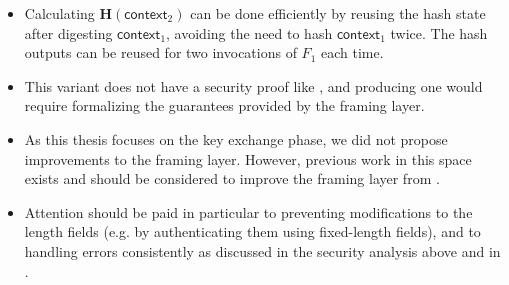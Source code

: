 \begin{itemize}
    \item Calculating $\mathbf{H}(\mathsf{context}_2)$ can be done efficiently by reusing the hash state after digesting $\mathsf{context}_1$, avoiding the need to hash $\mathsf{context}_1$ twice. The hash outputs can be reused for two invocations of $F_1$ each time.
    
    \item This variant does not have a security proof like \drivel{}, and producing one would require formalizing the guarantees provided by the framing layer.

    \item As this thesis focuses on the key exchange phase, we did not propose improvements to the framing layer. However, previous work in this space exists \cite{CCS:FenJoh24} and should be considered to improve the framing layer from \obfsfour{}.

    \item Attention should be paid in particular to preventing modifications to the length fields (e.g. by authenticating them using fixed-length fields), and to handling errors consistently as discussed in the security analysis above and in \cite[Section~3.3]{CCS:FenJoh24}.

\end{itemize}

